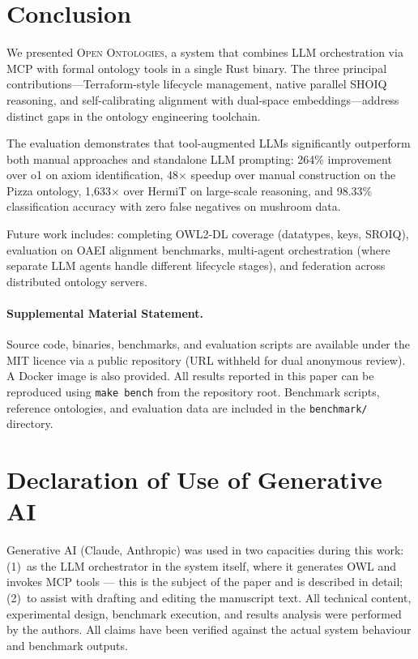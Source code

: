 \documentclass[runningheads]{llncs}
\begin{document}
\section{Conclusion}
\label{sec:conclusion}

We presented \textsc{Open Ontologies}, a system that combines LLM orchestration via MCP with formal ontology tools in a single Rust binary. The three principal contributions—Terraform-style lifecycle management, native parallel SHOIQ reasoning, and self-calibrating alignment with dual-space embeddings—address distinct gaps in the ontology engineering toolchain.

The evaluation demonstrates that tool-augmented LLMs significantly outperform both manual approaches and standalone LLM prompting: 264\% improvement over o1 on axiom identification, 48$\times$ speedup over manual construction on the Pizza ontology, 1{,}633$\times$ over HermiT on large-scale reasoning, and 98.33\% classification accuracy with zero false negatives on mushroom data.

Future work includes: completing OWL2-DL coverage (datatypes, keys, SROIQ), evaluation on OAEI alignment benchmarks, multi-agent orchestration (where separate LLM agents handle different lifecycle stages), and federation across distributed ontology servers.


\paragraph{Supplemental Material Statement.}
Source code, binaries, benchmarks, and evaluation scripts are available under the MIT licence via a public repository (URL withheld for dual anonymous review). A Docker image is also provided. All results reported in this paper can be reproduced using \texttt{make bench} from the repository root. Benchmark scripts, reference ontologies, and evaluation data are included in the \texttt{benchmark/} directory.


\section*{Declaration of Use of Generative AI}

Generative AI (Claude, Anthropic) was used in two capacities during this work: (1)~as the LLM orchestrator in the system itself, where it generates OWL and invokes MCP tools — this is the subject of the paper and is described in detail; (2)~to assist with drafting and editing the manuscript text. All technical content, experimental design, benchmark execution, and results analysis were performed by the authors. All claims have been verified against the actual system behaviour and benchmark outputs.
\end{document}
